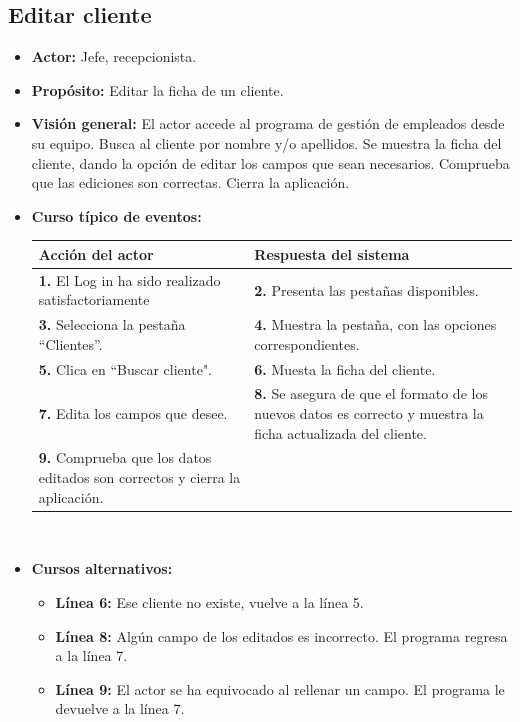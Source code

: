 \documentclass[spanish,a4paper,11pt, twoside]{report}	%
\begin{document}
	\subsection{Editar cliente}		
			\begin{itemize}
			\item \textbf{Actor:} Jefe, recepcionista.
			\item \textbf{Propósito:} Editar la ficha de un cliente.
			\item \textbf{Visión general:} El actor accede al programa de gestión de empleados desde su equipo. Busca al cliente por nombre y/o apellidos. Se muestra la ficha del cliente, dando la opción de editar los campos que sean necesarios. Comprueba que las ediciones son correctas. Cierra la aplicación. 
			\item \textbf{Curso típico de eventos:} 	\\
				\begin{tabular}{|p{6cm}||p{6cm}|}
				\hline
				\textbf{Acción del actor} & \textbf{Respuesta del sistema} \\ \hline \hline
				\textbf{1.} El Log in ha sido realizado satisfactoriamente & \textbf{2.} Presenta las pestañas disponibles.\\ \hline 
				\textbf{3.} Selecciona la pestaña “Clientes”. & \textbf{4.} Muestra la pestaña, con las opciones correspondientes. \\ \hline
				\textbf{5.} Clica en “Buscar cliente".	& \textbf{6.} Muesta la ficha del cliente. \\ \hline
				\textbf{7.} Edita los campos que desee. & \textbf{8.} Se asegura de que el formato de los nuevos datos es correcto y muestra la ficha actualizada del cliente.\\ \hline
				\textbf{9.} Comprueba que los datos editados son correctos y cierra la aplicación. & \textbf{} \\ \hline
			\end{tabular}
			\\
			\item \textbf{Cursos alternativos:} 
			\begin{itemize}
			\item  \textbf{Línea 6:} Ese cliente no existe, vuelve a la línea 5.
			\item  \textbf{Línea 8:} Algún campo de los editados es incorrecto. El programa regresa a la línea 7.
			\item  \textbf{Línea 9:} El actor se ha equivocado al rellenar un campo. El programa le devuelve a la línea 7.
			\end {itemize}
		\end{itemize}%
\end{document}
